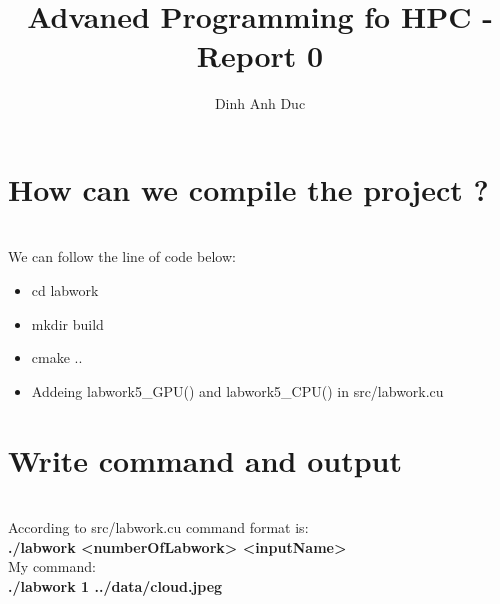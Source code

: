 \documentclass{article}
\title{Advaned Programming fo HPC - Report 0}
\author{Dinh Anh Duc}
\begin{document}
\maketitle

\section*{How can we compile the project ?}
\\
We can follow the line of code below:
\begin{itemize}
\item cd labwork
\item mkdir build
\item cmake ..
\item Addeing labwork5_GPU() and labwork5_CPU() in src/labwork.cu
\end{itemize}

\section*{Write command and output}
\\
According to src/labwork.cu command format is:
\\
\textbf{./labwork <numberOfLabwork> <inputName>}
\\
My command: 
\\
\textbf{./labwork 1 ../data/cloud.jpeg}
\end{document}
